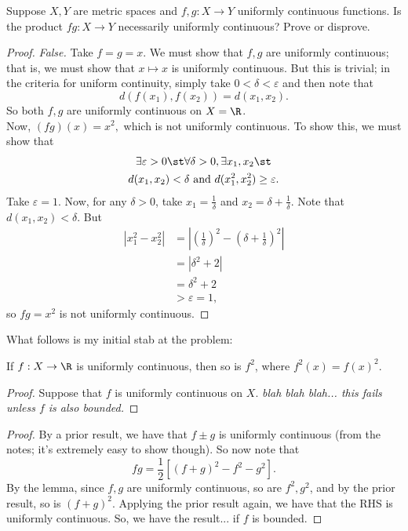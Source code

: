 \documentclass{assignment}
\begin{document}
\begin{question}[2]
  Suppose $X,Y$ are metric spaces and $f,g: X\to Y$ uniformly continuous functions. Is the product 
$fg: X\to Y$ necessarily uniformly continuous? Prove or disprove. 
\end{question}
\begin{proof}
  \emph{False.} Take $f = g = x$. We must show that $f,g$ are uniformly continuous; that is, we must
show that $x\mapsto x$ is uniformly continuous. But this is trivial; in the criteria for uniform
continuity, simply take $0 < \delta < \varepsilon$ and then note that $$d(f(x_1), f(x_2)) = d(x_1,
x_2).$$ So both $f,g$ are uniformly continuous on $X = \R$. \\

Now, $(fg)(x) = x^2,$ which is not uniformly continuous. To show this, we must show that 
\begin{gather*}
  \exists \varepsilon > 0 \st \forall \delta > 0, \exists x_1, x_2 \st \\
  d(x_1, x_2) < \delta \text{ and } d(x_1^2, x_2^2) \geq \varepsilon.
\end{gather*}
Take $\varepsilon = 1$. Now, for any $\delta > 0$, take $x_1 = \frac{1}{\delta}$ and $x_2 = \delta +
\frac{1}{\delta}$. Note that $d(x_1, x_2) < \delta$. But 
\begin{align*}
 |x_1^2 - x_2^2| &= \left|\left( \frac{1}{\delta} \right)^2 - \left( \delta + \frac{1}{\delta}
\right)^2\right| \\
                 &= |\delta^2 + 2| \\
                 &= \delta^2 + 2 \\
                 &> \varepsilon = 1,
\end{align*}
so $fg = x^2$ is not uniformly continuous.
\end{proof}
What follows is my initial stab at the problem:
\begin{lemma}
  If $f: X \to \R$ is uniformly continuous, then so is $f^2$, where $f^2(x) = f(x)^2.$
\end{lemma}
\begin{proof}
  Suppose that $f$ is uniformly continuous on $X$. \emph{blah blah blah... this fails unless $f$ is
also bounded.}
\end{proof}
\begin{proof}
  By a prior result, we have that $f \pm g$ is uniformly continuous (from the notes; it's extremely
easy to show though). So now note that $$fg = \frac{1}{2}\left[ (f+g)^2 - f^2 - g^2 \right].$$ By
the lemma, since $f, g$ are uniformly continuous, so are $f^2, g^2$, and by the prior result, so is
$(f + g)^2$. Applying the prior result again, we have that the RHS is uniformly continuous. So, we
have the result... if $f$ is bounded.
\end{proof}
\end{document}
